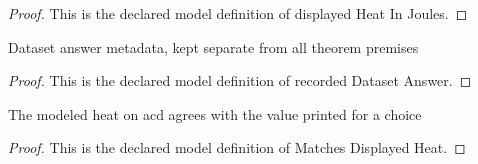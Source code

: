 \begin{proof}
  This is the declared model definition of displayed Heat In Joules.
\end{proof}
\begin{definition}
  \label{def:physics:phyx-mini-0471:phyxminiproblems-problemphyxmini0471-recordeddatasetanswer}
  Dataset answer metadata, kept separate from all theorem premises
\end{definition}
\begin{proof}
  This is the declared model definition of recorded Dataset Answer.
\end{proof}
\begin{definition}
  \label{def:physics:phyx-mini-0471:phyxminiproblems-problemphyxmini0471-matchesdisplayedheat}
  The modeled heat on acd agrees with the value printed for a choice
\end{definition}
\begin{proof}
  This is the declared model definition of Matches Displayed Heat.
\end{proof}
